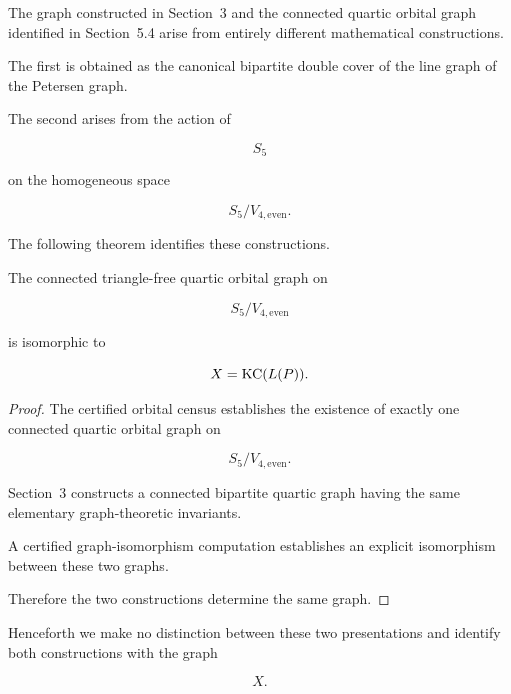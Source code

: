 The graph constructed in Section~3 and the connected quartic orbital graph
identified in Section~5.4 arise from entirely different mathematical
constructions.

The first is obtained as the canonical bipartite double cover of the line
graph of the Petersen graph.

The second arises from the action of

\[
S_{5}
\]

on the homogeneous space

\[
S_{5}/V_{4,\mathrm{even}}.
\]

The following theorem identifies these constructions.

\begin{theorem}
\label{thm:coincidence}

The connected triangle-free quartic orbital graph on

\[
S_{5}/V_{4,\mathrm{even}}
\]

is isomorphic to

\[
X=\operatorname{KC}(L(P)).
\]

\end{theorem}

\begin{proof}

The certified orbital census establishes the existence of exactly one
connected quartic orbital graph on

\[
S_{5}/V_{4,\mathrm{even}}.
\]

Section~3 constructs a connected bipartite quartic graph having the same
elementary graph-theoretic invariants.

A certified graph-isomorphism computation establishes an explicit
isomorphism between these two graphs.

Therefore the two constructions determine the same graph.

\end{proof}

Henceforth we make no distinction between these two presentations and
identify both constructions with the graph

\[
X.
\]
